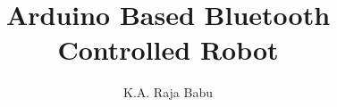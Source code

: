 \documentclass[journal,12pt,twocolumn]{IEEEtran}
\DeclareMathOperator*{\Res}{Res}
\begin{document}
\newtheorem{theorem}{Theorem}[section]
\newtheorem{problem}{Problem}
\newtheorem{proposition}{Proposition}[section]
\newtheorem{lemma}{Lemma}[section]
\newtheorem{corollary}[theorem]{Corollary}
\newtheorem{example}{Example}[section]
\newtheorem{definition}[problem]{Definition}

\newcommand{\BEQA}{\begin{eqnarray}}
\newcommand{\EEQA}{\end{eqnarray}}
\newcommand{\define}{\stackrel{\triangle}{=}}

\providecommand{\mbf}{\mathbf}
\providecommand{\pr}[1]{\ensuremath{\Pr\left(#1\right)}}
\providecommand{\qfunc}[1]{\ensuremath{Q\left(#1\right)}}
\providecommand{\sbrak}[1]{\ensuremath{{}\left[#1\right]}}
\providecommand{\lsbrak}[1]{\ensuremath{{}\left[#1\right.}}
\providecommand{\rsbrak}[1]{\ensuremath{{}\left.#1\right]}}
\providecommand{\brak}[1]{\ensuremath{\left(#1\right)}}
\providecommand{\lbrak}[1]{\ensuremath{\left(#1\right.}}
\providecommand{\rbrak}[1]{\ensuremath{\left.#1\right)}}
\providecommand{\cbrak}[1]{\ensuremath{\left\{#1\right\}}}
\providecommand{\lcbrak}[1]{\ensuremath{\left\{#1\right.}}
\providecommand{\rcbrak}[1]{\ensuremath{\left.#1\right\}}}


\theoremstyle{remark}
\newtheorem{rem}{Remark}
\newcommand{\sgn}{\mathop{\mathrm{sgn}}}
\providecommand{\abs}[1]{\left\vert#1\right\vert}
\providecommand{\res}[1]{\Res\displaylimits_{#1}} 
\providecommand{\norm}[1]{\left\lVert#1\right\rVert}
\providecommand{\mtx}[1]{\mathbf{#1}}
\providecommand{\mean}[1]{E\left[ #1 \right]}
\providecommand{\fourier}{\overset{\mathcal{F}}{ \rightleftharpoons}}
\providecommand{\system}{\overset{\mathcal{H}}{ \longleftrightarrow}}
\newcommand{\solution}{\noindent \textbf{Solution: }}
\newcommand{\cosec}{\,\text{cosec}\,}
\providecommand{\dec}[2]{\ensuremath{\overset{#1}{\underset{#2}{\gtrless}}}}
\newcommand{\myvec}[1]{\ensuremath{\begin{pmatrix}#1\end{pmatrix}}}
\newcommand{\mydet}[1]{\ensuremath{\begin{vmatrix}#1\end{vmatrix}}}
\makeatletter
{}
\makeatother
\let\StandardTheFigure\thefigure
\let\vec\mathbf
\renewcommand{\thefigure}{\theproblem}
\def\putbox#1#2#3{\makebox[0in][l]{\makebox[#1][l]{}\raisebox{\baselineskip}[0in][0in]{\raisebox{#2}[0in][0in]{#3}}}}
     \def\rightbox#1{\makebox[0in][r]{#1}}
     \def\centbox#1{\makebox[0in]{#1}}
     \def\topbox#1{\raisebox{-\baselineskip}[0in][0in]{#1}}
     \def\midbox#1{\raisebox{-0.5\baselineskip}[0in][0in]{#1}}
\vspace{3cm}
\title{Arduino Based Bluetooth Controlled Robot}
\author{K.A. Raja Babu}
\maketitle
\newpage
\bigskip
\renewcommand{\thefigure}{\theenumi}
\renewcommand{\thetable}{\theenumi}
\tableofcontents
\end{document}
